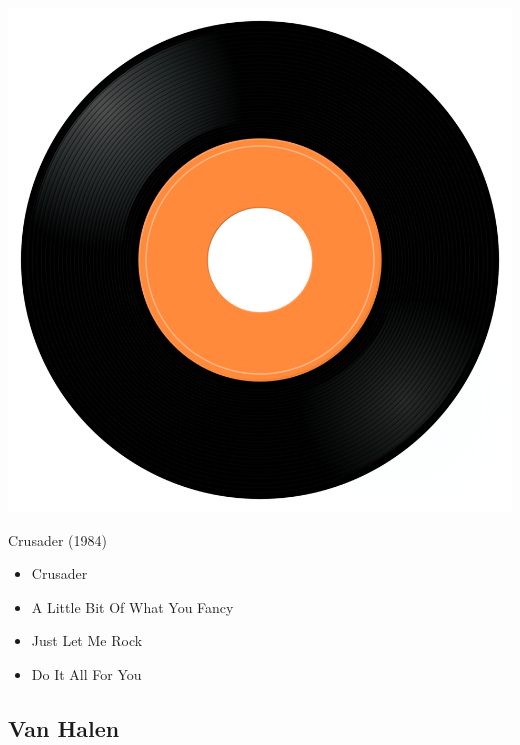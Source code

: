 \begin{minipage}[t]{0.25\textwidth}
\captionsetup{type=figure}
\includegraphics[width=\textwidth]{Images/cover.png}
\caption*{Crusader (1984)}
\end{minipage}
\begin{minipage}[t]{0.25\textwidth}\vspace{0pt}
\begin{itemize}[nosep,leftmargin=1em,labelwidth=*,align=left]
	\setlength{\itemsep}{0pt}
	\item Crusader
	\item A Little Bit Of What You Fancy
	\item Just Let Me Rock
	\item Do It All For You
\end{itemize}
\end{minipage}

\subsection{Van Halen}

